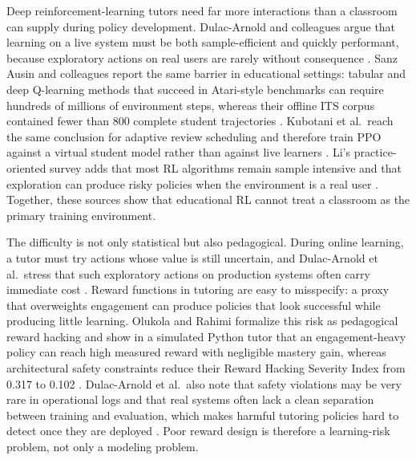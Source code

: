 Deep reinforcement-learning tutors need far more interactions than a classroom can supply during policy development. Dulac-Arnold and colleagues argue that learning on a live system must be both sample-efficient and quickly performant, because exploratory actions on real users are rarely without consequence \cite{dulacarnold_challenges_2021}. Sanz Ausin and colleagues report the same barrier in educational settings: tabular and deep Q-learning methods that succeed in Atari-style benchmarks can require hundreds of millions of environment steps, whereas their offline ITS corpus contained fewer than 800 complete student trajectories \cite{sanz_ausin_leveraging_2019}. Kubotani et al.\ reach the same conclusion for adaptive review scheduling and therefore train PPO against a virtual student model rather than against live learners \cite{kubotani_rltutor_2021}. Li's practice-oriented survey adds that most RL algorithms remain sample intensive and that exploration can produce risky policies when the environment is a real user \cite{li_reinforcement_2022}. Together, these sources show that educational RL cannot treat a classroom as the primary training environment.

The difficulty is not only statistical but also pedagogical. During online learning, a tutor must try actions whose value is still uncertain, and Dulac-Arnold et al.\ stress that such exploratory actions on production systems often carry immediate cost \cite{dulacarnold_challenges_2021}. Reward functions in tutoring are easy to misspecify: a proxy that overweights engagement can produce policies that look successful while producing little learning. Olukola and Rahimi formalize this risk as pedagogical reward hacking and show in a simulated Python tutor that an engagement-heavy policy can reach high measured reward with negligible mastery gain, whereas architectural safety constraints reduce their Reward Hacking Severity Index from 0.317 to 0.102 \cite{olukola_pedagogical_2026}. Dulac-Arnold et al.\ also note that safety violations may be very rare in operational logs and that real systems often lack a clean separation between training and evaluation, which makes harmful tutoring policies hard to detect once they are deployed \cite{dulacarnold_challenges_2021}. Poor reward design is therefore a learning-risk problem, not only a modeling problem.

